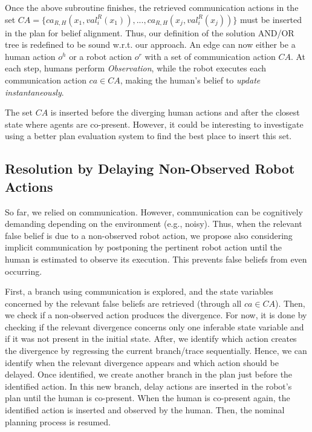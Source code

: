 {Once the above subroutine finishes, the retrieved communication actions in the set $\mathit{CA} = \{ ca_{R, H}(x_1,val^R_i(x_1)),..., ca_{R, H}(x_j,val^R_i(x_j)) \}$ must be inserted in the plan for belief alignment. 
Thus, our definition of the solution AND/OR tree is redefined to be sound w.r.t. our approach. An edge can now either be a human action $o^h$ or a robot action $o^r$ with a set of communication action $CA$.
At each step, humans perform \textit{Observation}, while the robot executes each communication action $ca \in \mathit{CA}$, making the human's belief to \textit{update instantaneously}.

The set $\mathit{CA}$ is inserted before the diverging human actions and after the closest state where agents are co-present. 
However, it could be interesting to investigate using a better plan evaluation system to find the best place to insert this set.

    \subsection{Resolution by Delaying Non-Observed Robot Actions}

So far, we relied on communication. However, communication can be cognitively demanding depending on the environment (e.g., noisy). 
Thus, when the relevant false belief is due to a non-observed robot action, we propose also considering implicit communication by postponing the pertinent robot action until the human is estimated to observe its execution. 
This prevents false beliefs from even occurring.

First, a branch using communication is explored, and the state variables concerned by the relevant false beliefs are retrieved (through all $ca \in CA$).
Then, we check if a non-observed action produces the divergence. For now, it is done by checking if the relevant divergence concerns only one inferable state variable and if it was not present in the initial state.   
After, we identify which action creates the divergence by regressing the current branch/trace sequentially. Hence, we can identify when the relevant divergence appears and which action should be delayed.
Once identified, we create another branch in the plan just before the identified action. In this new branch, {\sc delay} actions are inserted in the robot's plan until the human is co-present. When the human is co-present again, the identified action is inserted and observed by the human. Then, the nominal planning process is resumed.  

}
